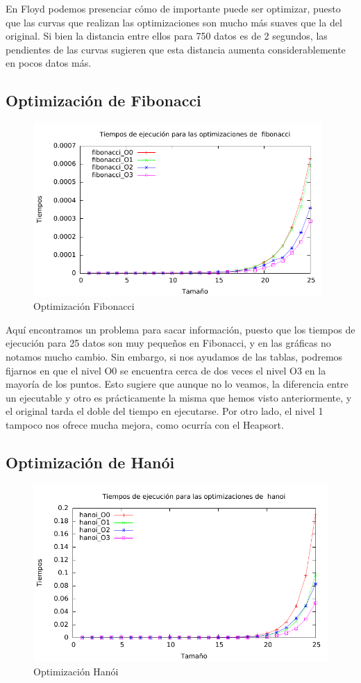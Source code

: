 \documentclass[a4paper, 11pt]{article}
\begin{document}
En Floyd podemos presenciar cómo de importante puede ser optimizar, puesto que las curvas que realizan las optimizaciones son mucho más suaves que la del original. Si bien la distancia entre ellos para 750 datos es de 2 segundos, las pendientes de las curvas sugieren que esta distancia aumenta considerablemente en pocos datos más.
\newpage
\subsection{Optimización de Fibonacci}

\begin{figure}[H]\includegraphics[width=11cm]{img/fibonacci_optim_g.pdf} \centering
	\caption{Optimización Fibonacci}\end{figure}

Aquí encontramos un problema para sacar información, puesto que los tiempos de ejecución para 25 datos son muy pequeños en Fibonacci, y en las gráficas no notamos mucho cambio. Sin embargo, si nos ayudamos de las tablas, podremos fijarnos en que el nivel O0 se encuentra cerca de dos veces el nivel O3 en la mayoría de los puntos. Esto sugiere que aunque no lo veamos, la diferencia entre un ejecutable y otro es prácticamente la misma que hemos visto anteriormente, y el original tarda el doble del tiempo en ejecutarse. Por otro lado, el nivel 1 tampoco nos ofrece mucha mejora, como ocurría con el Heapsort.
\newpage
\subsection{Optimización de Hanói}

\begin{figure}[H]\includegraphics[width=12cm]{img/hanoi_optim_g.pdf} \centering
	\caption{Optimización Hanói}\end{figure}
\end{document}
